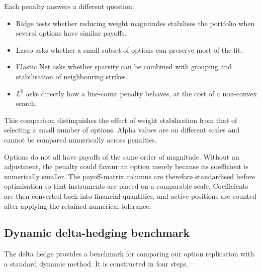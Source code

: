 \documentclass[12pt,a4paper]{article}
\newcommand{\1}{\mathbf{1}}
\begin{document}
Each penalty answers a different question:

\begin{itemize}
\item Ridge tests whether reducing weight magnitudes stabilises the portfolio when several options have similar payoffs.
\item Lasso asks whether a small subset of options can preserve most of the
fit.
\item Elastic Net asks whether sparsity can be combined with grouping and
stabilisation of neighbouring strikes.
\item $L^0$ asks directly how a line-count penalty behaves, at the cost of a
non-convex search.
\end{itemize}

This comparison distinguishes the effect of weight stabilisation from that of
selecting a small number of options. Alpha values are on different scales and
cannot be compared numerically across
penalties.

Options do not all have payoffs of the same order of magnitude. Without an
adjustment, the penalty could favour an option merely because its coefficient
is numerically smaller. The payoff-matrix columns are therefore standardised
before optimisation so that instruments are placed on a comparable scale.
Coefficients are then converted back into financial quantities, and active
positions are counted after applying the retained numerical tolerance.

\subsection{Dynamic delta-hedging benchmark}

The delta hedge provides a benchmark for comparing our option replication with
a standard dynamic method. It is constructed in four steps.
\end{document}
